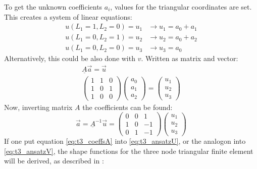   To get the unknown coefficients $a_i$, values for the triangular coordinates are set. This creates a system of linear equations:
  \begin{align}
  u(L_1=1, L_2=0) = u_1 &\rightarrow u_1 = a_0 + a_1 \nonumber\\
  u(L_1=0, L_2=1) = u_2 &\rightarrow u_2 = a_0 + a_2 \nonumber\\
  u(L_1=0, L_2=0) = u_3 &\rightarrow u_3 = a_0
  \end{align}
  Alternatively, this could be also done with $v$. Written as matrix and vector:
  \begin{align}
  \underline{A} \vec{a} = \vec{u} \nonumber\\
  \begin{pmatrix}
  1 & 1 & 0\\
  1 & 0 & 1\\
  1 & 0 & 0
  \end{pmatrix} \begin{pmatrix}
  a_0 \\ a_1 \\ a_2
  \end{pmatrix} = \begin{pmatrix}
  u_1 \\ u_2 \\ u_3
  \end{pmatrix}
  \end{align}
  Now, inverting matrix $A$ the coefficients can be found:
  \begin{equation}\label{eq:t3_coeffsA}
  \vec{a} = \underline{A}^{-1} \vec{u} = \begin{pmatrix}
  0 & 0 & 1\\
  1 & 0 & -1\\
  0 & 1 & -1
  \end{pmatrix} \begin{pmatrix}
  u_1 \\ u_2 \\ u_3
  \end{pmatrix}
  \end{equation}
  If one put equation \ref{eq:t3_coeffsA} into \ref{eq:t3_ansatzU}, or the analogon into \ref{eq:t3_ansatzV}, the shape functions for the three node triangular finite element will be derived, as described in \cite{steinke2005finite}:
